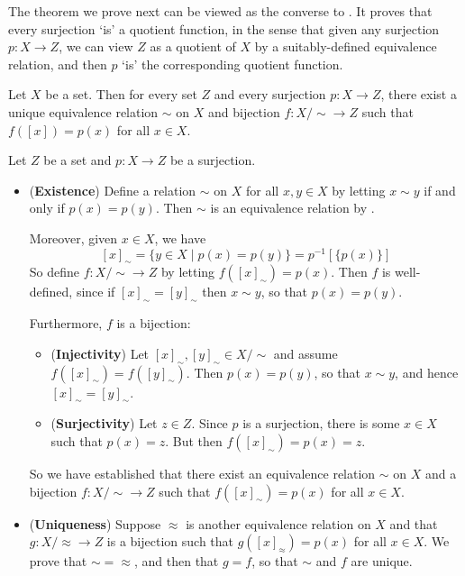 The theorem we prove next can be viewed as the converse to . It proves that every surjection `is' a quotient function, in the sense that given any surjection $p : X \to Z$, we can view $Z$ as a quotient of $X$ by a suitably-defined equivalence relation, and then $p$ `is' the corresponding quotient function.

\begin{theorem}
\label{thmEquivalenceRelationsSurjections}
Let $X$ be a set. Then for every set $Z$ and every surjection $p : X \to Z$, there exist a unique equivalence relation $\sim$ on $X$ and bijection $f : X/{\sim} \to Z$ such that $f([x]) = p(x)$ for all $x \in X$.
\end{theorem}

\begin{cproof}
Let $Z$ be a set and $p : X \to Z$ be a surjection.
\begin{itemize}
\item (\textbf{Existence}) Define a relation $\sim$ on $X$ for all $x,y \in X$ by letting $x \sim y$ if and only if $p(x) = p(y)$. Then $\sim$ is an equivalence relation by .

Moreover, given $x \in X$, we have
\[ [x]_{\sim} = \{ y \in X \mid p(x) = p(y) \} = p^{-1}[\{p(x)\}] \]
So define $f : X/{\sim} \to Z$ by letting $f([x]_{\sim}) = p(x)$. Then $f$ is well-defined, since if $[x]_{\sim} = [y]_{\sim}$ then $x \sim y$, so that $p(x)=p(y)$.

Furthermore, $f$ is a bijection:
\begin{itemize}
\item (\textbf{Injectivity}) Let $[x]_{\sim},[y]_{\sim} \in X/{\sim}$ and assume $f([x]_{\sim}) = f([y]_{\sim})$. Then $p(x)=p(y)$, so that $x \sim y$, and hence $[x]_{\sim} = [y]_{\sim}$.
\item (\textbf{Surjectivity}) Let $z \in Z$. Since $p$ is a surjection, there is some $x \in X$ such that $p(x) = z$. But then $f([x]_{\sim}) = p(x) = z$.
\end{itemize}
So we have established that there exist an equivalence relation $\sim$ on $X$ and a bijection $f : X/{\sim} \to Z$ such that $f([x]_{\sim}) = p(x)$ for all $x \in X$.

\item (\textbf{Uniqueness}) Suppose $\approx$ is another equivalence relation on $X$ and that $g : X/{\approx} \to Z$ is a bijection such that $g([x]_{\approx}) = p(x)$ for all $x \in X$. We prove that ${\sim} = {\approx}$, and then that $g = f$, so that $\sim$ and $f$ are unique.


\end{itemize}
\end{cproof}
